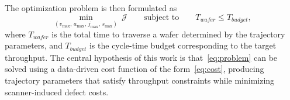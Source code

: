 The optimization problem is then formulated as
\begin{equation}
    \min_{(v_{\max},\, a_{\max},\, j_{\max},\, s_{\max})} \ \mathcal{J}
    \qquad \text{subject to} \qquad T_{wafer} \leq T_{budget},
    \label{eq:problem}
\end{equation}
where $T_{wafer}$ is the total time to traverse a wafer determined by the trajectory parameters, and $T_{budget}$ is the cycle-time budget corresponding to the target throughput. The central hypothesis of this work is that~\eqref{eq:problem} can be solved using a data-driven cost function of the form~\eqref{eq:cost}, producing trajectory parameters that satisfy throughput constraints while minimizing scanner-induced defect costs.

